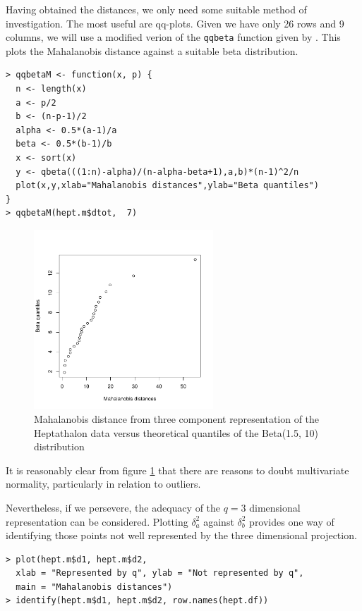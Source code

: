 Having obtained the distances, we only need some suitable method of investigation.   The most useful are qq-plots.   Given we have only 26 rows and 9 columns, we will use a modified verion of the \texttt{qqbeta} function given by \cite{Bilodeau+Brenner:1999}.   This plots the Mahalanobis distance against a suitable beta distribution.

\singlespacing
\begin{verbatim}
> qqbetaM <- function(x, p) {
  n <- length(x)
  a <- p/2
  b <- (n-p-1)/2
  alpha <- 0.5*(a-1)/a
  beta <- 0.5*(b-1)/b
  x <- sort(x)
  y <- qbeta(((1:n)-alpha)/(n-alpha-beta+1),a,b)*(n-1)^2/n
  plot(x,y,xlab="Mahalanobis distances",ylab="Beta quantiles")
}
> qqbetaM(hept.m$dtot,  7)
\end{verbatim}
\onehalfspacing

\begin{figure}
\begin{center}
\includegraphics[width = 0.6\textwidth]{images/qqd1}
\caption{Mahalanobis distance from three component representation of the Heptathalon data versus theoretical quantiles of the Beta(1.5, 10) distribution}
\label{qqd1}
\end{center}
\end{figure}

It is reasonably clear from figure \ref{qqd1} that there are reasons to doubt multivariate normality, particularly in relation to outliers.    

Nevertheless, if we persevere, the adequacy of the $q=3$ dimensional representation can be considered.   Plotting $\delta_{a}^{2}$ against  $\delta_{b}^{2}$ provides one way of identifying those points not well represented by the three dimensional projection.

\singlespacing
\begin{verbatim}
> plot(hept.m$d1, hept.m$d2, 
  xlab = "Represented by q", ylab = "Not represented by q", 
  main = "Mahalanobis distances")
> identify(hept.m$d1, hept.m$d2, row.names(hept.df))
\end{verbatim}
\onehalfspacing

